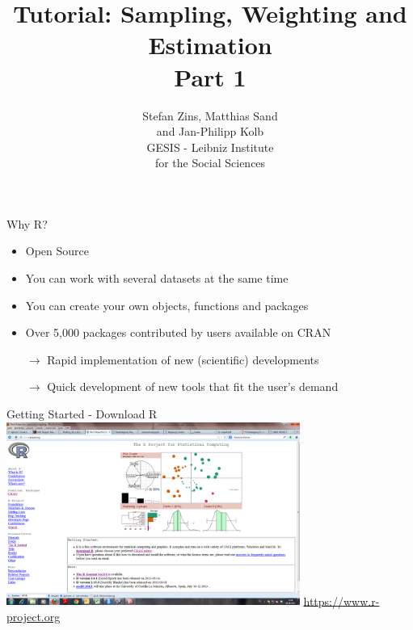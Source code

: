 \documentclass[11pt,german,hideothersubsections]{beamer}\usepackage[]{graphicx}\usepackage[]{color}
\title[Day 1]{Tutorial: Sampling, Weighting and Estimation\\ \Large{Part 1} }
\author[M. Sand]{Stefan Zins, Matthias Sand\\ and Jan-Philipp Kolb\\ \vspace{.5cm} \footnotesize{GESIS - Leibniz Institute\\ for the Social Sciences}}
\date[]{\color{dunkelgrau}\footnotesize}
\begin{document}
\maketitle




\begin{frame}[fragile]{Why R?}
\begin{itemize}
\item Open Source 
\vspace{.25cm}
\item You can work with several datasets at the same time
\vspace{.25cm}
\item You can create your own objects, functions and packages
\vspace{.25cm}
\item Over 5,000 packages contributed by users available on CRAN
\vspace{.25cm}
\item[$\rightarrow$] Rapid implementation of new (scientific) developments
\vspace{.25cm}
\item[$\rightarrow$] Quick development of new tools that fit the user's demand
\end{itemize}
\end{frame}
\begin{frame}[fragile]{Getting Started - Download R}
\includegraphics[width=\linewidth, height=6cm]{../../../tutorial/graphs/Rproject.png}
\vspace{.5cm}
\centering
\url{https://www.r-project.org}

\end{frame}
\end{document}
